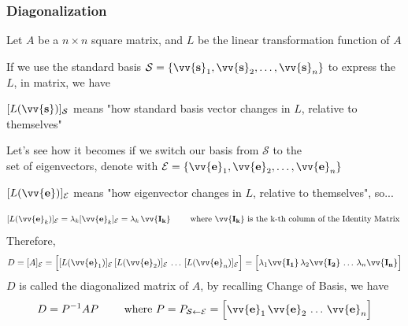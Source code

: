 \documentclass[11pt]{article}
\DeclareRobustCommand{\myvec}[1]{\vv{\mathbf{#1}}}
\newcommand{\myset}[1]{\mathcal{#1}}
\newcommand{\mymat}[1]{#1}
\begin{document}
    \begin{minipage}{\textwidth}
        \subsubsection{Diagonalization}
        Let $\mymat{A}$ be a $n \times n$ square matrix, and $\mymat{L}$ be the linear transformation function of $\mymat{A}$ 
        \vspace{2ex}

        If we use the standard basis $\myset{S} = \{ \myvec{s}_1, \myvec{s}_2, \dots, \myvec{s}_n \}$ to express the $\mymat{L}$, in matrix, we have 
        \vspace{1ex}
    
        $[\mymat{L}(\myvec{s})]_\myset{S}$ means "how standard basis vector changes in $\mymat{L}$, relative to themselves"
        \vspace{2ex}
        
        Let's see how it becomes if we switch our basis from $\myset{S}$ to the \\
        set of eigenvectors, denote with $\myset{E} = \{ \myvec{e}_1, \myvec{e}_2, \dots, \myvec{e}_n \}$ 
        \vspace{1ex}
    
        $[\mymat{L}(\myvec{e})]_\myset{E}$ means "how eigenvector changes in $\mymat{L}$, relative to themselves", so...
      
        \[ [\mymat{L}(\myvec{e}_k)]_\myset{E} = \lambda_k [\myvec{e}_k]_{\myset{E}} = \lambda_k\,\myvec{\mymat{I}_k} \qquad \text{ where $\myvec{\mymat{I}_k}$ is the k-th column of the Identity Matrix }\]
        Therefore, 
        \begin{equation*}
            \mymat{D} = [\mymat{A}]_{\myset{E}} = \Big[ [\mymat{L}(\myvec{e}_1)]_\myset{E}\,[\mymat{L}(\myvec{e}_2)]_\myset{E}\,\dots\,[\mymat{L}(\myvec{e}_n)]_\myset{E} \Big] = \Big[ \lambda_1\myvec{\mymat{I}_1}\,\lambda_2\myvec{\mymat{I}_2}\,\dots\,\lambda_n\myvec{\mymat{I}_n} \Big]
        \end{equation*}
        $\mymat{D}$ is called the diagonalized matrix of $\mymat{A}$, by recalling Change of Basis, we have
        \begin{equation}
            \mymat{D} = \mymat{P}^{-1} \mymat{A} \mymat{P} \qquad \text{ where }\mymat{P} = \mymat{P}_{\myset{S}\leftarrow\myset{E}} = \Big[ \myvec{e}_1\,\myvec{e}_2\,\dots\,\myvec{e}_n \Big]
        \end{equation}
    \end{minipage}
    
\end{document}
